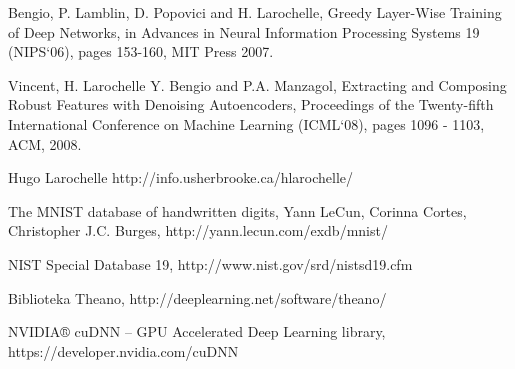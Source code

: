 \documentclass[fleqn]{scrartcl}
\begin{document}
\begin{thebibliography}{99}

 Bengio, P. Lamblin, D. Popovici and H. Larochelle, Greedy Layer-Wise Training of Deep Networks, in Advances in Neural Information Processing Systems 19 (NIPS‘06), pages 153-160, MIT Press 2007.

 Vincent, H. Larochelle Y. Bengio and P.A. Manzagol, Extracting and Composing Robust Features with Denoising Autoencoders, Proceedings of the Twenty-fifth International Conference on Machine Learning (ICML‘08), pages 1096 - 1103, ACM, 2008.

 Hugo Larochelle http://info.usherbrooke.ca/hlarochelle/

 The MNIST database of handwritten digits, Yann LeCun, Corinna Cortes, Christopher J.C. Burges, http://yann.lecun.com/exdb/mnist/

 NIST Special Database 19, http://www.nist.gov/srd/nistsd19.cfm

 Biblioteka Theano, http://deeplearning.net/software/theano/

 NVIDIA® cuDNN – GPU Accelerated Deep Learning library, https://developer.nvidia.com/cuDNN




\end{thebibliography}
\end{document}
